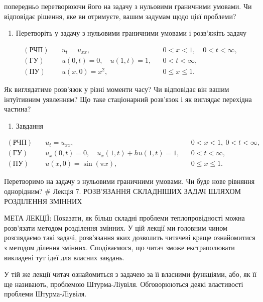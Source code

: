 попередньо перетворюючи його на задачу з нульовими граничними умовами. Чи відповідає рішення, яке ви отримуєте, вашим задумам щодо цієї проблеми?

\begin{enumerate}
\def\labelenumi{\arabic{enumi}.}
\setcounter{enumi}{1}
\tightlist
\item
  Перетворіть у задачу з нульовими граничними умовами і розв'яжіть задачу
\end{enumerate}

\[
\begin{aligned}
(\text{РЧП})\quad & u_t = u_{xx}, && 0 < x < 1,\quad 0 < t < \infty, \\
(\text{ГУ})\quad & u(0,t)=0,\quad u(1,t)=1, && 0 < t < \infty, \\
(\text{ПУ})\quad & u(x,0)=x^2, && 0 \le x \le 1.
\end{aligned}
\]

Як виглядатиме розв'язок у різні моменти часу? Чи відповідає він вашим інтуїтивним уявленням? Що таке стаціонарний розв'язок і як виглядає перехідна частина?

\begin{enumerate}
\def\labelenumi{\arabic{enumi}.}
\setcounter{enumi}{2}
\tightlist
\item
  Завдання
\end{enumerate}

\[
\begin{aligned}
(\text{РЧП})\quad & u_t = u_{xx}, && 0 < x < 1,\ 0 < t < \infty, \\
(\text{ГУ})\quad & u_x(0,t) = 0,\quad u_x(1,t) + h u(1,t) = 1, && 0 < t < \infty, \\
(\text{ПУ})\quad & u(x,0) = \sin(\pi x), && 0 \leqslant x \leqslant 1.
\end{aligned}
\]

Перетворимо на задачу з нульовими граничними умовами. Чи буде нове рівняння однорідним? \# Лекція 7. РОЗВ'ЯЗАННЯ СКЛАДНІШИХ ЗАДАЧ ШЛЯХОМ РОЗДІЛЕННЯ ЗМІННИХ

МЕТА ЛЕКЦІЇ: Показати, як більш складні проблеми теплопровідності можна розв'язати методом розділення змінних. У цій лекції ми головним чином розглядаємо такі задачі, розв'язання яких дозволить читачеві краще ознайомитися з методом ділення змінних. Сподіваємося, що читач зможе екстраполювати викладені тут ідеї для власних завдань.

У тій же лекції читач ознайомиться з задачею за її власними функціями, або, як її ще називають, проблемою Штурма-Ліувіля. Обговорюються деякі властивості проблеми Штурма-Ліувіля.


